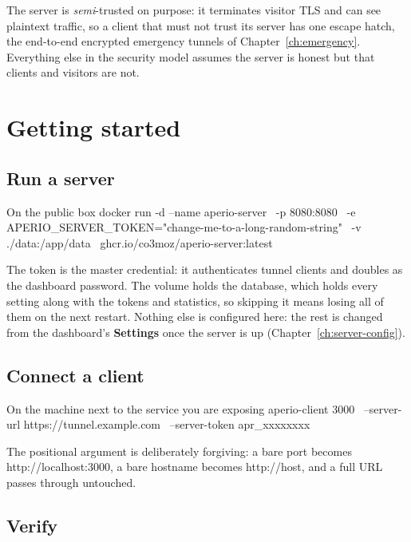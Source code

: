 \documentclass[11pt,a4paper,oneside]{book}
\newcommand{\aperiobreakableunderscore}{\textunderscore\allowbreak}
\newcommand{\aperiocodebreaks}{\XeTeXinterchartokenstate=1 }
\newcommand{\aperiocodebreaks}{}
\DeclareRobustCommand{\code}[1]{{\ttfamily\small\aperiocodebreaks
  \let\_\aperiobreakableunderscore#1}}
\begin{document}
The server is \emph{semi}-trusted on purpose: it terminates visitor TLS
and can see plaintext traffic, so a client that must not trust its server
has one escape hatch, the end-to-end encrypted emergency tunnels of
Chapter~\ref{ch:emergency}. Everything else in the security model assumes
the server is honest but that clients and visitors are not.

\chapter{Getting started}
\label{ch:getting-started}

\section{Run a server}

\begin{codecard}[aperiosh]{On the public box}
docker run -d --name aperio-server \
  -p 8080:8080 \
  -e APERIO_SERVER_TOKEN="change-me-to-a-long-random-string" \
  -v ./data:/app/data \
  ghcr.io/co3moz/aperio-server:latest
\end{codecard}

The token is the master credential: it authenticates tunnel clients and
doubles as the dashboard password. The volume holds the database, which
holds every setting along with the tokens and statistics, so skipping it
means losing all of them on the next restart. Nothing else is configured
here: the rest is changed from the dashboard's \textbf{Settings} once the
server is up (Chapter~\ref{ch:server-config}).

\section{Connect a client}

\begin{codecard}[aperiosh]{On the machine next to the service you are exposing}
aperio-client 3000 \
  --server-url https://tunnel.example.com \
  --server-token apr_xxxxxxxx
\end{codecard}

The positional argument is deliberately forgiving: a bare port becomes
\code{http://localhost:3000}, a bare hostname becomes \code{http://host},
and a full URL passes through untouched.

\section{Verify}
\end{document}
